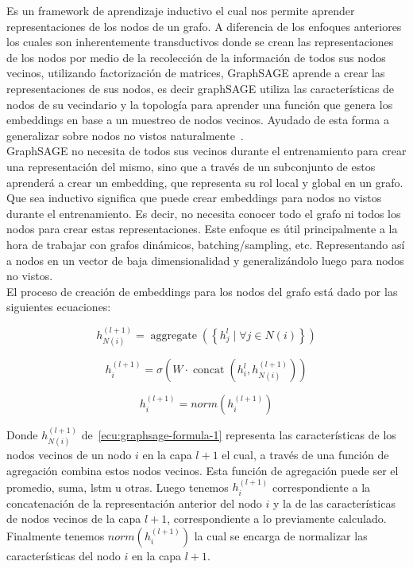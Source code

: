 Es un framework de aprendizaje inductivo el cual nos permite aprender representaciones de los nodos de un grafo. A diferencia de los enfoques anteriores los cuales son inherentemente transductivos donde se crean las representaciones de los nodos por medio de la recolección de la información de todos sus nodos vecinos, utilizando factorización de matrices, GraphSAGE aprende a crear las representaciones de sus nodos, es decir graphSAGE utiliza las características de nodos de su vecindario y la topología para aprender una función que genera los embeddings en base a un muestreo de nodos vecinos. Ayudado de esta forma a generalizar sobre nodos no vistos naturalmente~\cite{GraphSAGE}. \\

GraphSAGE no necesita de todos sus vecinos durante el entrenamiento para crear una representación del mismo, sino que a través de un subconjunto de estos aprenderá a crear un embedding, que representa su rol local y global en un grafo.\\
 
Que sea inductivo significa que puede crear embeddings para nodos no vistos durante el entrenamiento. Es decir, no necesita conocer todo el grafo ni todos los nodos para crear estas representaciones. 
Este enfoque es útil principalmente a la hora de trabajar con grafos dinámicos, batching/sampling, etc. Representando así a nodos en un vector de baja dimensionalidad y generalizándolo luego para nodos no vistos.\\

El proceso de creación de embeddings para los nodos del grafo está dado por las siguientes ecuaciones:

\begin{equation}
    h^{(l+1)}_{N(i)} = \operatorname{aggregate}\!\left(\left\{ h^l_j \mid \forall j \in N(i)\right\}\right)
    \label{ecu:graphsage-formula-1}
\end{equation}


\begin{equation}
    h^{(l+1)}_i = \sigma\!\left(W \cdot \operatorname{concat}\!\left(h^l_i, h^{(l+1)}_{N(i)}\right)\right)
    \label{ecu:graphsage-formula-2}
\end{equation}

\begin{equation}
    h^{(l+1)}_i = norm(h^{(l+1)}_i)
    \label{ecu:graphsage-formula-3}
\end{equation}

Donde $h^{(l+1)}_{N(i)}$ de~\ref{ecu:graphsage-formula-1} representa las características de los nodos vecinos de un nodo $i$ en la capa $l+1$ el cual, a través de una función de agregación combina estos nodos vecinos. Esta función de agregación puede ser el promedio, suma, lstm u otras.
Luego tenemos $h^{(l+1)}_i$ correspondiente a la concatenación de la representación anterior del nodo $i$ y la de las características de nodos vecinos de la capa $l+1$, correspondiente a lo previamente calculado.
Finalmente tenemos $norm(h^{(l+1)}_i)$ la cual se encarga de normalizar las características del nodo $i$ en la capa $l+1$.\\

